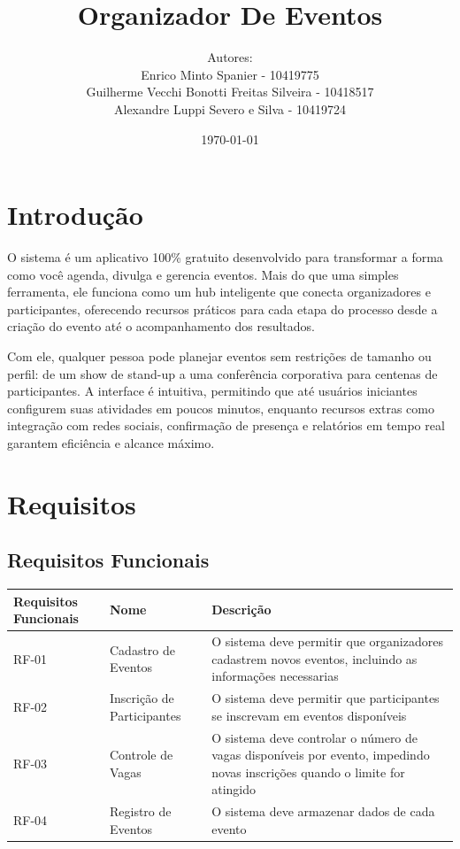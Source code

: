 \documentclass[12pt,a4paper]{article}
\begin{document}
\title{Organizador De Eventos}
\author{Autores:\\Enrico Minto Spanier - 10419775 \\ Guilherme Vecchi Bonotti Freitas Silveira - 10418517 \\ Alexandre Luppi Severo e Silva - 10419724}
\date{\today}


\maketitle
\tableofcontents
\newpage

\section{Introdução}
O sistema é um aplicativo 100\% gratuito desenvolvido para transformar a forma como você agenda, divulga e gerencia eventos. Mais do que uma simples ferramenta, ele funciona como um hub inteligente que conecta organizadores e participantes, oferecendo recursos práticos para cada etapa do processo desde a criação do evento até o acompanhamento dos resultados.

Com ele, qualquer pessoa pode planejar eventos sem restrições de tamanho ou perfil: de um show de stand-up a uma conferência corporativa para centenas de participantes. A interface é intuitiva, permitindo que até usuários iniciantes configurem suas atividades em poucos minutos, enquanto recursos extras como integração com redes sociais, confirmação de presença e relatórios em tempo real garantem eficiência e alcance máximo.

\section{Requisitos}

\subsection{Requisitos Funcionais}


\begin{tabular}{ | m{6em} | m{5cm}| m{20em} |}
  \hline
  Requisitos Funcionais & Nome & Descrição \\
  \hline
  RF-01 & Cadastro de Eventos & O sistema deve permitir que organizadores cadastrem novos eventos, incluindo as informações necessarias \\ 
  \hline
  RF-02 & Inscrição de Participantes & O sistema deve permitir que participantes se inscrevam em eventos disponíveis\\ 
  \hline
  RF-03 & Controle de Vagas & O sistema deve controlar o número de vagas disponíveis por evento, impedindo novas inscrições quando o limite for atingido \\ 
  \hline
  RF-04 & Registro de Eventos & O sistema deve armazenar dados de cada evento \\ 
  \hline
\end{tabular}
\end{document}
